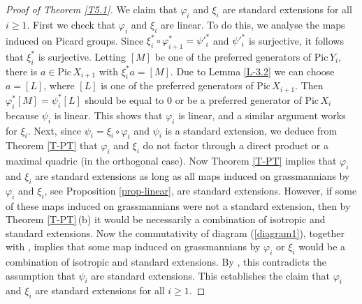 \documentclass[12pt]{amsart}
\newcommand{\Pic}{\mathrm{Pic}}
\theoremstyle{definition}
\begin{document}
\begin{proof}[Proof of Theorem \ref{T5.1}]
We claim that $\varphi_i$ and $\xi_i$ are standard extensions for all $i\geq 1$. First we check that $\varphi_i$ and $\xi_i$ are linear. To do this, we analyse the maps induced on  Picard groups.
Since $\xi_i^*\circ\varphi_{i+1}^*=\psi'^*_i$ and $\psi'^*_i$ is surjective, it follows that $\xi_i^*$ is surjective. Letting $[M]$ be one of the preferred generators of $\Pic\,Y_i$, there is $a\in\Pic\,X_{i+1}$ with $\xi_i^*a=[M]$. Due to Lemma \ref{L-3.2}  we can choose $a=[L]$, where $[L]$ is one of the preferred generators of $\Pic\,X_{i+1}$. Then $\varphi_i^*[M]=\psi_i^*[L]$ should be equal to $0$ or be a preferred generator of $\Pic\,X_i$ because $\psi_i$ is linear. This shows that $\varphi_i$ is linear, and a similar argument works for $\xi_i$.
Next, since $\psi_i=\xi_i\circ\varphi_i$ and $\psi_i$ is a standard extension, we deduce from Theorem \ref{T-PT}  that $\varphi_i$ and $\xi_i$ do not factor through a direct product or a maximal quadric (in the orthogonal case). Now Theorem \ref{T-PT} implies that $\varphi_i$ and $\xi_i$ are standard extensions as long as all maps induced on grassmannians by $\varphi_i$ and $\xi_i$, see Proposition \ref{prop-linear}, are standard extensions. However, if some of these maps induced on grassmannians were not a standard extension, then by Theorem \ref{T-PT}\,(b) it would be necessarily a combination of isotropic and standard extensions. Now the commutativity of diagram (\ref{diagram1}), together with \cite[Lemma 3.9]{PT1}, implies that some map induced on grassmannians by $\varphi_i$ or $\xi_i$ would be a combination of isotropic and standard extensions. By \cite[Remark 3.10]{PT1}, this contradicts the assumption that $\psi_i$ are standard extensions. This establishes the claim that $\varphi_i$ and $\xi_i$ are standard extensions for all $i\geq 1$.



\end{proof}
\end{document}
